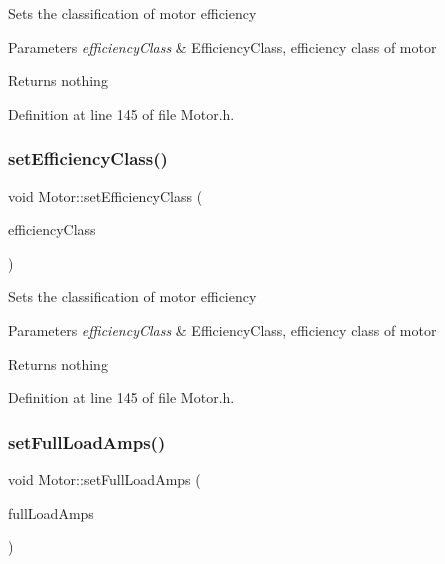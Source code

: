 Sets the classification of motor efficiency


\begin{DoxyParams}{Parameters}
{\em efficiency\+Class} & Efficiency\+Class, efficiency class of motor\\
\hline
\end{DoxyParams}
\begin{DoxyReturn}{Returns}
nothing 
\end{DoxyReturn}


Definition at line 145 of file Motor.\+h.

\mbox{\label{class_motor_afa82df266d74ccfed49bf592b5b6526f}} 
\subsubsection{\texorpdfstring{set\+Efficiency\+Class()}{setEfficiencyClass()}\hspace{0.1cm}{\footnotesize\ttfamily [3/3]}}
{\footnotesize\ttfamily void Motor\+::set\+Efficiency\+Class (\begin{DoxyParamCaption}\item[{\hyperlink{class_motor_afa022971ae062406a9f588c601673d4e}{Efficiency\+Class}}]{efficiency\+Class }\end{DoxyParamCaption})\hspace{0.3cm}{\ttfamily [inline]}}

Sets the classification of motor efficiency


\begin{DoxyParams}{Parameters}
{\em efficiency\+Class} & Efficiency\+Class, efficiency class of motor\\
\hline
\end{DoxyParams}
\begin{DoxyReturn}{Returns}
nothing 
\end{DoxyReturn}


Definition at line 145 of file Motor.\+h.

\mbox{\label{class_motor_a4bc8bf85c7749a0b7ff279d7eef20a2e}} 
\subsubsection{\texorpdfstring{set\+Full\+Load\+Amps()}{setFullLoadAmps()}\hspace{0.1cm}{\footnotesize\ttfamily [1/3]}}
{\footnotesize\ttfamily void Motor\+::set\+Full\+Load\+Amps (\begin{DoxyParamCaption}\item[{double}]{full\+Load\+Amps }\end{DoxyParamCaption})\hspace{0.3cm}{\ttfamily [inline]}}


